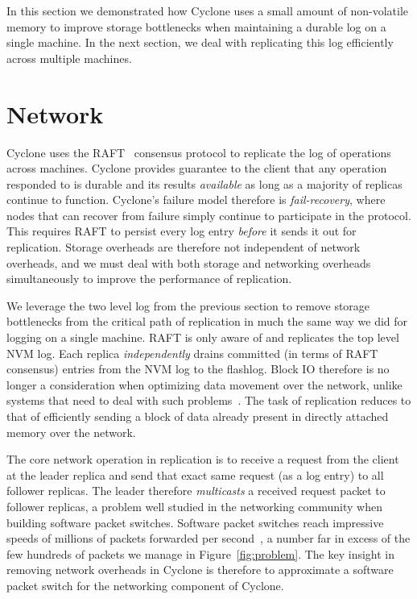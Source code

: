 \documentclass[pageno]{jpaper}
\begin{document}
In this section we demonstrated how Cyclone uses a small amount of non-volatile
memory to improve storage bottlenecks when maintaining a durable log on a single
machine. In the next section, we deal with replicating this log efficiently
across multiple machines.

\section{Network}
\label{sec:network}
Cyclone uses the RAFT~\cite{raft} consensus protocol to replicate the log of
operations across machines. Cyclone provides guarantee to the client that any
operation responded
to is durable and its results \emph{available} as long as a majority of replicas
continue to function. Cyclone's failure model therefore is \emph{fail-recovery},
where nodes that can recover from failure simply continue to participate in
the protocol. This
requires RAFT to persist every log entry \emph{before} it sends it out for
replication. Storage overheads are therefore not independent of network
overheads, and we must deal with both storage and networking overheads
simultaneously to improve the performance of replication.

We leverage the two level log from the previous section to remove storage
bottlenecks from the critical path of replication in much the same way we did
for logging on a single machine. RAFT is only aware of and replicates the top
level NVM log. Each replica \emph{independently} drains committed (in terms of
RAFT consensus) entries from the NVM log to the flashlog. Block IO therefore is
no longer a consideration when optimizing data movement over the network, unlike
systems that need to deal with such problems~\cite{reflex}. The task of
replication reduces to that of efficiently sending a block of data already
present in directly attached memory over the network. 

The core network operation in replication is to receive a request from the
client at the leader replica and send that exact same request (as a log entry)
to all follower replicas. The leader therefore \emph{multicasts} a received
request packet to follower replicas, a problem well studied in the networking
community when building software packet switches. Software packet switches reach
impressive speeds of millions of packets forwarded per second~\cite{dpdk_perf}, 
a number far in excess of the few hundreds of packets we manage in
Figure~\ref{fig:problem}. The key insight in removing network overheads in
Cyclone is therefore to approximate a software packet switch for the networking
component of Cyclone.
\end{document}
